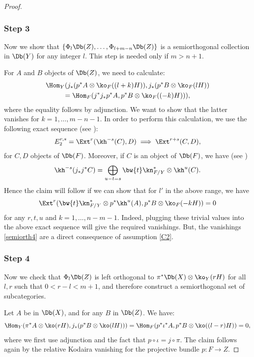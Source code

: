 \begin{proof}
\subsubsection*{Step 3}
Now we show that $\{\Phi_l \Db(Z),\ldots,\Phi_{l+m-n}\Db(Z) \}$ is a semiorthogonal collection in $\Db(Y)$
for any integer $l$. This step is needed only if $m > n+1$.

For $A$ and $B$ objects of $\Db(Z)$, we need to calculate:\vspace*{-3pt}
\begin{multline*}\label{eq:want-to-vanish1}
\Hom_Y(j_*(p^* A \otimes \ko_F((l+k)H)), j_*(p^* B \otimes \ko_F(lH))\\
=\Hom_F(j^* j_* p^* A, p^* B \otimes \ko_F((-k)H))),
\end{multline*}
where the equality follows by adjunction. We want to show that the latter vanishes
for $k=1, \ldots, m-n-1$.
In order to perform this calculation, we use the following exact
sequence (see \cite[Rem.\,3.7]{Huybook}):\vspace*{-3pt}
\[
E_2^{r,s} = \Ext^r (\kh^{-s}(C),D) \implies \Ext^{r+s}(C,D),
\]
for $C,D$ objects of $\Db(F)$.
Moreover, if $C$ is an object of $\Db(F)$, we have (see \cite[Cor.\,11.2]{Huybook})\vspace*{-3pt}
\[
\kh^{-s} (j_* j^* C) = \bigoplus_{u-t=s} \bw{t} \kn_{F/Y}^* \otimes \kh^u(C).
\]
Hence the claim will follow if we can show that for $l'$ in the above range, we have
\begin{equation}\label{semiorth4}
\Ext^r(\bw{t} \kn_{F/Y}^* \otimes p^* \kh^u (A),p^* B \otimes \ko_F(-kH))=0
\end{equation}
for any $r,t,u$ and $k=1,\ldots,n-m-1$. Indeed, plugging these trivial values into the above
exact sequence will give the required vanishings. But, the vanishings \eqref{semiorth4} are
a direct consequence of assumption \eqref{C2}.

\subsubsection*{Step 4}
Now we check that $\Phi_l \Db(Z)$ is left orthogonal to $\pi^* \Db(X) \otimes \ko_Y(rH)$ for all
$l,r$ such that $0 < r-l < m+1$, and therefore construct a semiorthogonal set of subcategories.

Let $A$ be in $\Db(X)$,
and for any $B$ in $\Db(Z)$. We have:
\begin{equation*}\label{eq:2nd-orthogonality}
\Hom_Y(\pi^* A \otimes \ko(rH),j_* (p^*B \otimes \ko(lH)))= \Hom_F(p^* \iota^* A , p^*B \otimes \ko((l-r)H))= 0,
\end{equation*}
where we first use adjunction and the fact that $p \circ \iota = j \circ \pi$.
The claim follows again by the relative Kodaira vanishing for
the projective bundle $p: F \to Z$.


\end{proof}
